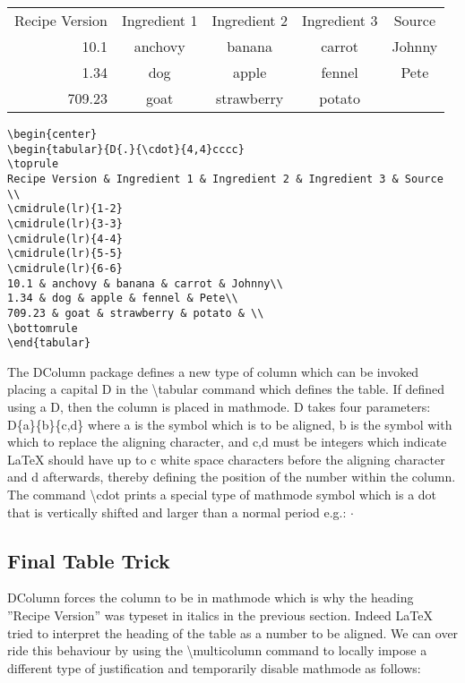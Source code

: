 \begin{center}
\begin{tabular}{D{.}{\cdot}{4,4}cccc}
\toprule
Recipe Version & Ingredient 1 & Ingredient 2 & Ingredient 3 & Source \\
\cmidrule(lr){1-1}
\cmidrule(lr){2-2}
\cmidrule(lr){3-3}
\cmidrule(lr){4-4}
\cmidrule(lr){5-5}
10.1 & anchovy & banana & carrot & Johnny\\
1.34 & dog & apple & fennel & Pete\\
709.23 & goat & strawberry & potato & \\
\bottomrule
\end{tabular}

\vspace*{2ex}

\begin{verbatim}
\begin{center}
\begin{tabular}{D{.}{\cdot}{4,4}cccc}
\toprule
Recipe Version & Ingredient 1 & Ingredient 2 & Ingredient 3 & Source \\
\cmidrule(lr){1-2}
\cmidrule(lr){3-3}
\cmidrule(lr){4-4}
\cmidrule(lr){5-5}
\cmidrule(lr){6-6}
10.1 & anchovy & banana & carrot & Johnny\\
1.34 & dog & apple & fennel & Pete\\
709.23 & goat & strawberry & potato & \\
\bottomrule
\end{tabular}
\end{verbatim}
\end{center}

The DColumn package defines a new type of column which can be invoked placing a capital D in the {\textbackslash}tabular command which defines the table. If defined using a D, then the column is placed in mathmode. D takes four parameters: D\{a\}\{b\}\{c,d\} where a is the symbol which is to be aligned, b is the symbol with which to replace the aligning character, and {c,d} must be integers which indicate LaTeX should have up to c white space characters before the aligning character and d afterwards, thereby defining the position of the number within the column. The command {\textbackslash}cdot prints a special type of mathmode symbol which is a dot that is vertically shifted and larger than a normal period e.g.: $\cdot$ 

\pagebreak
\subsection{Final Table Trick}
DColumn forces the column to be in mathmode which is why the heading ''Recipe Version'' was typeset in italics in the previous section. Indeed LaTeX tried to interpret the heading of the table as a number to be aligned.  We can over ride this behaviour by using the {\textbackslash}multicolumn command to locally impose a different type of justification and temporarily disable mathmode as follows:

